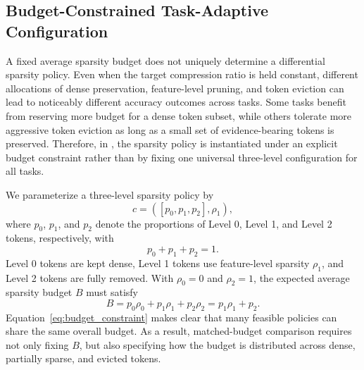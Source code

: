 
\subsection{Budget-Constrained Task-Adaptive Configuration}
\label{sec:budget-config}

A fixed average sparsity budget does not uniquely determine a differential sparsity policy.
Even when the target compression ratio is held constant, different allocations of dense preservation,
feature-level pruning, and token eviction can lead to noticeably different accuracy outcomes across tasks.
Some tasks benefit from reserving more budget for a dense token subset, while others tolerate more aggressive
token eviction as long as a small set of evidence-bearing tokens is preserved.
Therefore, in \method, the sparsity policy is instantiated under an explicit budget constraint rather than by
fixing one universal three-level configuration for all tasks.

We parameterize a three-level sparsity policy by
\begin{equation}
c = ([p_0,p_1,p_2], \rho_1),
\end{equation}
where $p_0$, $p_1$, and $p_2$ denote the proportions of Level 0, Level 1, and Level 2 tokens, respectively,
with
\begin{equation}
p_0 + p_1 + p_2 = 1.
\end{equation}
Level 0 tokens are kept dense, Level 1 tokens use feature-level sparsity $\rho_1$, and Level 2 tokens are fully removed.
With $\rho_0 = 0$ and $\rho_2 = 1$, the expected average sparsity budget $B$ must satisfy
\begin{equation}
B = p_0 \rho_0 + p_1 \rho_1 + p_2 \rho_2 = p_1 \rho_1 + p_2.
\label{eq:budget_constraint}
\end{equation}
Equation~\eqref{eq:budget_constraint} makes clear that many feasible policies can share the same overall budget.
As a result, matched-budget comparison requires not only fixing $B$, but also specifying how the budget is distributed
across dense, partially sparse, and evicted tokens.

